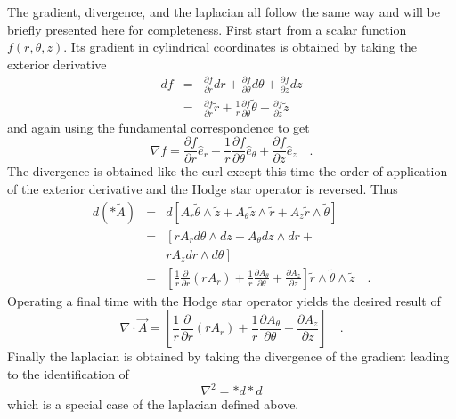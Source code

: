 \documentclass[twocolumn]{article}
\def\.{{\quad .}}
\begin{document}
The gradient, divergence, and the laplacian all follow the same
way and will be briefly presented here for completeness.  First start 
from a scalar function $f(r,\theta,z)$.  Its gradient in cylindrical 
coordinates is obtained by taking the exterior derivative
\begin{eqnarray*}
	df & = & 
	     \frac{\partial f}{\partial r} dr +
	     \frac{\partial f}{\partial \theta} d \theta +
		 \frac{\partial f}{\partial z} dz \\
	   & = & 
	     \frac{\partial f}{\partial r} \tilde r +
		 \frac{1}{r}
	     \frac{\partial f}{\partial \theta} \tilde \theta +
    	 \frac{\partial f}{\partial z} \tilde z
\end{eqnarray*}
and again using the fundamental correspondence to get
\[
	\nabla f =
         \frac{\partial f}{\partial r} {\hat e}_r +
		 \frac{1}{r}
	     \frac{\partial f}{\partial \theta} {\hat e}_{\theta} +
    	 \frac{\partial f}{\partial z} {\hat e}_z \.
\] 
The divergence is obtained like the curl except this time the order
of application of the exterior derivative and the Hodge star operator
is reversed.  Thus
\begin{eqnarray*}
	d \left( \ast {\tilde A} \right) 
	                  & = & d \left[
	                      A_r \tilde \theta \wedge \tilde z +
						  A_{\theta} \tilde z \wedge \tilde r +
						  A_z \tilde r \wedge \tilde \theta
						  \right] \\
					  & = &
						  \left[
	                      r A_r d\theta \wedge dz +
						  A_{\theta} dz \wedge dr + 
						  \right.\\
				      &   &
						  \left.
						  r A_z dr \wedge d\theta
                          \right] \\
				      & = &
					      \left[
						    \frac{1}{r}
							\frac{\partial}
							     {\partial r}
								 \left(r A_r \right) 
							+
							\frac{1}{r}
							\frac{\partial A_{\theta}}
							     {\partial \theta}
							+
							\frac{\partial A_z}
							     {\partial z}
						  \right]
						  \tilde r \wedge 
						  \tilde \theta \wedge
						  \tilde z \.
\end{eqnarray*}
Operating a final time with the Hodge star operator yields the desired
result of
\[
	\nabla \cdot \vec A =
					      \left[
						    \frac{1}{r}
							\frac{\partial}
							     {\partial r}
								 \left(r A_r \right) 
							+
							\frac{1}{r}
							\frac{\partial A_{\theta}}
							     {\partial \theta}
							+
							\frac{\partial A_z}
							     {\partial z}
						  \right] \.
\]
Finally the laplacian is obtained by taking the divergence of the 
gradient leading to the identification of
\[
	\nabla^2 = \ast d \ast d
\] 
which is a special case of the laplacian defined above.
\end{document}
